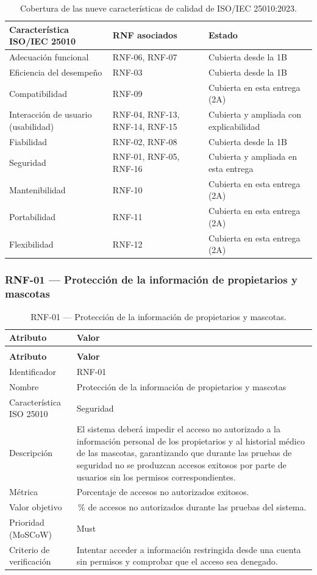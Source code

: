 \documentclass[journal,onecolumn]{IEEEtran}
\makeatletter
\newenvironment{atributos}[2]{%
	\small
	\begin{longtable}{@{}>{\raggedright\arraybackslash}p{4.2cm} >{\raggedright\arraybackslash}p{11.2cm}@{}}
		\caption{#2}\label{tab:#1}\\
		\toprule
		\textbf{Atributo} & \textbf{Valor} \\
		\midrule
		\endfirsthead
		\multicolumn{2}{@{}l}{\small\itshape (continuación)}\\
		\toprule
		\textbf{Atributo} & \textbf{Valor} \\
		\midrule
		\endhead
		\bottomrule
		\endlastfoot
	}{%
	\end{longtable}
	\normalsize
}
\makeatother
\begin{document}
	\begin{table}[H]
		\centering
		\caption{Cobertura de las nueve características de calidad de ISO/IEC 25010:2023.}
		\label{tab:cobertura-25010}
		\small
		\begin{tabularx}{\textwidth}{@{}p{5.2cm} p{3.2cm} X@{}}
			\toprule
			\textbf{Característica ISO/IEC 25010} & \textbf{RNF asociados} & \textbf{Estado} \\
			\midrule
			Adecuación funcional & RNF-06, RNF-07 & Cubierta desde la 1B \\
			Eficiencia del desempeño & RNF-03 & Cubierta desde la 1B \\
			Compatibilidad & RNF-09 & Cubierta en esta entrega (2A) \\
			Interacción de usuario (usabilidad) & RNF-04, RNF-13, RNF-14, RNF-15 & Cubierta y ampliada con explicabilidad \\
			Fiabilidad & RNF-02, RNF-08 & Cubierta desde la 1B \\
			Seguridad & RNF-01, RNF-05, RNF-16 & Cubierta y ampliada en esta entrega \\
			Mantenibilidad & RNF-10 & Cubierta en esta entrega (2A) \\
			Portabilidad & RNF-11 & Cubierta en esta entrega (2A) \\
			Flexibilidad & RNF-12 & Cubierta en esta entrega (2A) \\
			\bottomrule
		\end{tabularx}
	\end{table}
	
	\subsubsection{RNF-01 --- Protección de la información de propietarios y mascotas}
	
	\begin{atributos}{RNF-01}{RNF-01 --- Protección de la información de propietarios y mascotas.}
		Identificador & RNF-01 \\
		Nombre & Protección de la información de propietarios y mascotas \\
		Característica ISO 25010 & Seguridad \\
		Descripción & El sistema deberá impedir el acceso no autorizado a la información personal de los propietarios y al historial médico de las mascotas, garantizando que durante las pruebas de seguridad no se produzcan accesos exitosos por parte de usuarios sin los permisos correspondientes. \\
		Métrica & Porcentaje de accesos no autorizados exitosos. \\
		Valor objetivo & 0\,\% de accesos no autorizados durante las pruebas del sistema. \\
		Prioridad (MoSCoW) & Must \\
		Criterio de verificación & Intentar acceder a información restringida desde una cuenta sin permisos y comprobar que el acceso sea denegado. \\
	\end{atributos}
	
\end{document}

